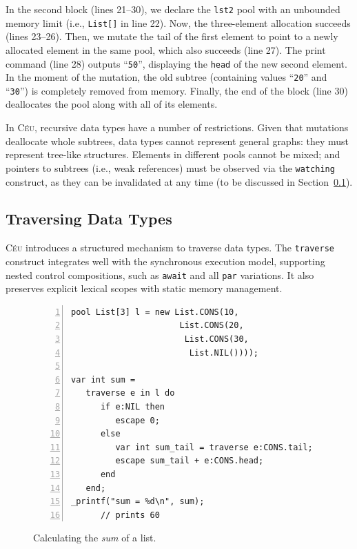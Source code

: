 \documentclass{sig-alternate}
\newcommand{\CEU}{\textsc{C\'{e}u}\xspace}
\newcommand{\code}[1] {{\small{\texttt{#1}}}}
\begin{document}
In the second block (lines 21--30), we declare the \code{lst2} pool with an
unbounded memory limit (i.e., \code{List[]} in line 22).
Now, the three-element allocation succeeds (lines 23--26).
Then, we mutate the tail of the first element to point to a newly allocated 
element in the same pool, which also succeeds (line 27).
The print command (line 28) outputs ``\texttt{50}'', displaying the \code{head}
of the new second element.
In the moment of the mutation, the old subtree (containing values  ``\texttt{20}''
and  ``\texttt{30}'') is completely removed from memory.
Finally, the end of the block (line 30) deallocates the pool along with all of 
its elements.


In \CEU, recursive data types have a number of restrictions.
Given that mutations deallocate whole subtrees, data types cannot represent 
general graphs: they must represent tree-like structures.
Elements in different pools cannot be mixed;
and pointers to subtrees (i.e., weak references) must be observed via the
\code{watching} construct, as they can be invalidated at any time
(to be discussed in Section~\ref{sec.traverse}).


\subsection{Traversing Data Types}
\label{sec.traverse}

\CEU introduces a structured mechanism to traverse data types.
The \code{traverse} construct integrates well with the synchronous execution 
model, supporting nested control compositions, such as \code{await} and all 
\code{par} variations.
It also preserves explicit lexical scopes with static memory management.

\begin{figure}%
\begin{lstlisting}[numbers=left,xleftmargin=3em]
pool List[3] l = new List.CONS(10,
                      List.CONS(20,
                       List.CONS(30,
                        List.NIL())));

var int sum =
   traverse e in l do
      if e:NIL then
         escape 0;
      else
         var int sum_tail = traverse e:CONS.tail;
         escape sum_tail + e:CONS.head;
      end
   end;
_printf("sum = %d\n", sum);
      // prints 60
\end{lstlisting}
\caption{
Calculating the \emph{sum} of a list.
\label{lst.list.sum}
}
\end{figure}
\end{document}
